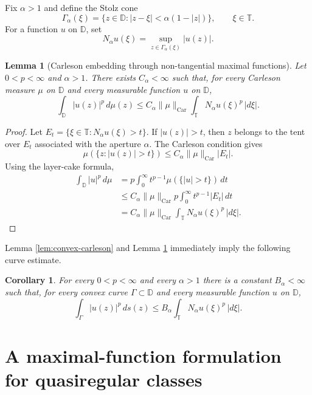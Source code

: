 \documentclass[11pt]{article}
\newtheorem{lemma}[theorem]{Lemma}
\newtheorem{corollary}[theorem]{Corollary}
\theoremstyle{definition}
\theoremstyle{remark}
\newcommand{\D}{\mathbb D}
\newcommand{\T}{\mathbb T}
\newcommand{\ds}{\,ds}
\newcommand{\Car}{\operatorname{Car}}
\begin{document}
Fix $\alpha>1$ and define the Stolz cone
\[
   \Gamma_\alpha(\xi)=\{z\in\D: |z-\xi|<\alpha(1-|z|)\},
   \qquad \xi\in\T.
\]
For a function $u$ on $\D$, set
\[
   N_\alpha u(\xi)=\sup_{z\in\Gamma_\alpha(\xi)} |u(z)|.
\]

\begin{lemma}[Carleson embedding through non-tangential maximal functions]\label{lem:max-embed}
Let $0<p<\infty$ and $\alpha>1$. There exists $C_\alpha<\infty$ such that, for every Carleson measure $\mu$ on $\D$ and every measurable function $u$ on $\D$,
\begin{equation}\label{eq:max-embed}
   \int_\D |u(z)|^p\,d\mu(z)
   \le C_\alpha\|\mu\|_{\Car}
      \int_\T N_\alpha u(\xi)^p\,|d\xi|.
\end{equation}
\end{lemma}

\begin{proof}
Let $E_t=\{\xi\in\T:N_\alpha u(\xi)>t\}$. If $|u(z)|>t$, then $z$ belongs to the tent over $E_t$ associated with the aperture $\alpha$. The Carleson condition gives
\[
   \mu(\{z:|u(z)|>t\})
   \le C_\alpha\|\mu\|_{\Car}|E_t|.
\]
Using the layer-cake formula,
\begin{align*}
   \int_\D |u|^p\,d\mu
   &=p\int_0^\infty t^{p-1}\mu(\{|u|>t\})\,dt \\
   &\le C_\alpha\|\mu\|_{\Car}
      p\int_0^\infty t^{p-1}|E_t|\,dt \\
   &=C_\alpha\|\mu\|_{\Car}
      \int_\T N_\alpha u(\xi)^p\,|d\xi|.
\end{align*}
\end{proof}

Lemma \ref{lem:convex-carleson} and Lemma \ref{lem:max-embed} immediately imply the following curve estimate.

\begin{corollary}\label{cor:curve-max}
For every $0<p<\infty$ and every $\alpha>1$ there is a constant $B_\alpha<\infty$ such that, for every convex curve $\Gamma\subset\D$ and every measurable function $u$ on $\D$,
\begin{equation}\label{eq:curve-max}
   \int_\Gamma |u(z)|^p\ds(z)
   \le B_\alpha\int_\T N_\alpha u(\xi)^p\,|d\xi|.
\end{equation}
\end{corollary}

\section{A maximal-function formulation for quasiregular classes}
\end{document}
